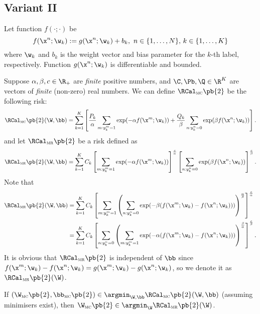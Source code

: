\subsection{Variant II}

Let function $f(\cdot; \cdot)$ be
$$
f(\x^n; \w_k) := g(\x^n; \w_k) + b_k, \ n \in \{1,\dots,N\}, \, k \in \{1,\dots,K\}
$$
where $\w_k$ and $b_k$ is the weight vector and bias parameter for the $k$-th label, respectively.
Function $g(\x^n; \w_k)$ is differentiable and bounded.

Suppose $\alpha, \beta, c \in \R_+$ are \emph{finite} positive numbers, 
and $\C, \Pb, \Q \in \R^K$ are vectors of \emph{finite} (non-zero) real numbers.
We can define $\RCal_\textsc{mc}\pb{2}$ be the following risk:
\begin{equation}
\label{eq:mc2}
\RCal_\textsc{mc}\pb{2}(\W, \bb) 
= \sum_{k=1}^K \left[ 
  \frac{P_k}{\alpha} \sum_{m: y_k^m = 1} \exp(-\alpha f(\x^m; \w_k)) +
  \frac{Q_k}{\beta } \sum_{n: y_k^n = 0} \exp( \beta  f(\x^n; \w_k)) \right].
\end{equation}
and let $\RCal_\textsc{mr}\pb{2}$ be a risk defined as
\begin{equation}
\label{eq:mr2}
\RCal_\textsc{mr}\pb{2}(\W, \bb) 
= \sum_{k=1}^K C_k
  \left[ \sum_{m: y_k^m = 1} \exp(-\alpha f(\x^m; \w_k)) \right]^\frac{c}{\alpha} 
  \left[ \sum_{n: y_k^n = 0} \exp( \beta  f(\x^n; \w_k)) \right]^\frac{c}{\beta}.
\end{equation}
Note that 
\begin{equation*}
\begin{aligned}
\RCal_\textsc{mr}\pb{2}(\W, \bb)
&= \sum_{k=1}^K C_k
   \left[ \sum_{m: y_k^m = 1} \left( \sum_{n: y_k^n = 0} 
   \exp(-\beta(f(\x^m; \w_k) - f(\x^n; \w_k))) \right)^\frac{\alpha}{\beta} \right]^\frac{c}{\alpha} \\
&= \sum_{k=1}^K C_k
   \left[ \sum_{n: y_k^n = 0} \left( \sum_{m: y_k^m = 1}
   \exp(-\alpha(f(\x^m; \w_k) - f(\x^n; \w_k))) \right)^\frac{\beta}{\alpha} \right]^\frac{c}{\beta}.
\end{aligned}
\end{equation*}
It is obvious that $\RCal_\textsc{mr}\pb{2}$ is independent of $\bb$ since $f(\x^m; \w_k) - f(\x^n; \w_k) = g(\x^m; \w_k) - g(\x^n; \w_k)$,
so we denote it as $\RCal_\textsc{mr}\pb{2}(\W)$.


\begin{theorem}
\label{theorem:mc2mr2}
If $(\W_\textsc{mc}\pb{2}, \bb_\textsc{mc}\pb{2}) \in \argmin_{\W,\bb} \RCal_\textsc{mc}\pb{2}(\W, \bb)$ (assuming minimisers exist),
then $\W_\textsc{mc}\pb{2} \in \argmin_\W \RCal_\textsc{mr}\pb{2}(\W)$.
\end{theorem}


